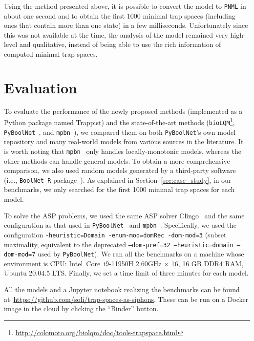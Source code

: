 \documentclass[preprint,12pt]{elsarticle}
\begin{document}
Using the method presented above, it is possible to convert the model to \texttt{PNML} in about one second and to obtain the first 1000 minimal trap spaces (including ones that contain more than one state) in a few milliseconds.
Unfortunately since this was not available at the time, the analysis of the model remained very high-level and qualitative, instead of being able to use the rich information of computed minimal trap spaces.

\section{Evaluation}%
\label{sec:eval}

To evaluate the performance of the newly proposed methods (implemented as a Python package named Trappist) and the state-of-the-art methods (\texttt{bioLQM}\footnote{\url{http://colomoto.org/biolqm/doc/tools-trapspace.html}}, \texttt{PyBoolNet}~\cite{klarner2015computing,klarner2017pyboolnet}, and \texttt{mpbn}~\cite{Paulev2020}), we compared them on both \texttt{PyBoolNet}'s own model repository and many real-world models from various sources in the literature.
It is worth noting that \texttt{mpbn}~\cite{Paulev2020} only handles locally-monotonic models, whereas the other methods can handle general models.
To obtain a more comprehensive comparison, we also used random models generated by a third-party software (i.e., \texttt{BoolNet R} package~\cite{mussel2010boolnet}).
As explained in Section~\ref{sec:case_study}, in our benchmarks, we only searched for the first 1000 minimal trap spaces for each model.

To solve the ASP problems, we used the same ASP solver Clingo~\cite{DBLP:journals/aicom/GebserKKOSS11} and the same configuration as that used in \texttt{PyBoolNet}~\cite{klarner2015computing,klarner2017pyboolnet} and \texttt{mpbn}~\cite{Paulev2020}.
Specifically, we used the configuration \texttt{-heuristic=Domain -enum-mod=domRec -dom-mod=3} (subset maximality, equivalent to the deprecated \texttt{--dom-pref=32 --heuristic=domain --dom-mod=7} used by \texttt{PyBoolNet}). 
We ran all the benchmarks on a machine whose environment is CPU: \@ Intel\textregistered\ Core\texttrademark\ i9-11950H 2.60GHz × 16, 16 GB DDR4 RAM, Ubuntu 20.04.5 LTS. 
Finally, we set a time limit of three minutes for each model.

All the models and a Jupyter notebook realizing the benchmarks can be found at~\url{https://github.com/soli/trap-spaces-as-siphons}.
These can be run on a Docker image in the cloud by clicking the ``Binder'' button.
\end{document}

